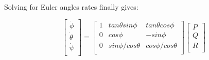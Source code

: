 Solving for Euler angles rates finally gives:

\begin{equation}
\label{S10}
 \begin{bmatrix}
 	\dot{\phi} \\
 	\dot{\theta} \\
 	\dot{\psi} \\
 	\end{bmatrix}=\begin{bmatrix}
 	1 & tan\theta sin\phi & tan\theta cos\phi \\
 	0 & cos\phi & -sin\phi  \\
 	0 & sin\phi / cos\theta & cos\phi / cos\theta  \\
 	\end{bmatrix}\begin{bmatrix}
 	P \\
 	Q \\
 	R \\
\end{bmatrix}
\end{equation}
